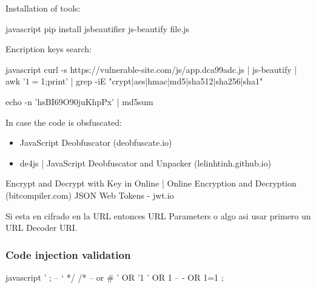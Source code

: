 \documentclass[letterpaper,12pt]{extarticle}
\begin{document}
Installation of tools:
\begin{sourcecode}{javascript}
pip install jsbeautifier
js-beautify file.js
\end{sourcecode}
	
Encription keys search:
\begin{sourcecode}{javascript}
curl -s https://vulnerable-site.com/js/app.dca99adc.js | js-beautify | awk '{$1=$1;print}' | grep -iE  "crypt|aes|hmac|md5|sha512|sha256|sha1"

echo -n 'hsBI69O90juKhpPx' | md5sum 
\end{sourcecode}

In case the code is obsfuscated:
\begin{itemize}
	\item JavaScript Deobfuscator (deobfuscate.io)
	\item de4js | JavaScript Deobfuscator and Unpacker (lelinhtinh.github.io)
\end{itemize}

Encrypt and Decrypt with Key in Online | Online Encryption and Decryption (bitcompiler.com)
JSON Web Tokens - jwt.io

Si esta en cifrado en la URL entonces URL Parameters o algo asi usar primero un URL Decoder URI.

\subsubsection{Code injection validation}

\begin{sourcecode}{javascript}
' ; -- ` */ /* -- or # ' OR '1 ' OR 1 -- - OR 1=1 ;%
\end{sourcecode}
\end{document}
